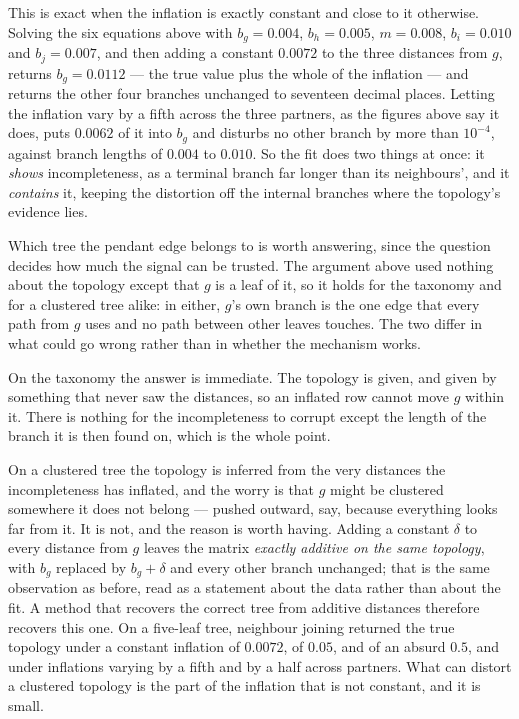 \documentclass[pdflatex,sn-vancouver-num]{sn-jnl}
\begin{document}
This is exact when the inflation is exactly constant and close to it otherwise. Solving the six
equations above with $b_g = 0.004$, $b_h = 0.005$, $m = 0.008$, $b_i = 0.010$ and $b_j = 0.007$, and
then adding a constant $0.0072$ to the three distances from $g$, returns $b_g = 0.0112$ --- the true
value plus the whole of the inflation --- and returns the other four branches unchanged to seventeen
decimal places. Letting the inflation vary by a fifth across the three partners, as the figures above
say it does, puts $0.0062$ of it into $b_g$ and disturbs no other branch by more than
$10^{-4}$, against branch lengths of $0.004$ to $0.010$. So the fit does two things at once: it \emph{shows} incompleteness, as a terminal
branch far longer than its neighbours', and it \emph{contains} it, keeping the distortion off the
internal branches where the topology's evidence lies.

Which tree the pendant edge belongs to is worth answering, since the question decides how much the
signal can be trusted. The argument above used nothing about the topology except that $g$ is a leaf of
it, so it holds for the taxonomy and for a clustered tree alike: in either, $g$'s own branch is the
one edge that every path from $g$ uses and no path between other leaves touches. The two differ in
what could go wrong rather than in whether the mechanism works.

On the taxonomy the answer is immediate. The topology is given, and given by something that never
saw the distances, so an inflated row cannot move $g$ within it. There is nothing for the
incompleteness to corrupt except the length of the branch it is then found on, which is the whole
point.

On a clustered tree the topology is inferred from the very distances the incompleteness has inflated,
and the worry is that $g$ might be clustered somewhere it does not belong --- pushed outward, say,
because everything looks far from it. It is not, and the reason is worth having. Adding a constant
$\delta$ to every distance from $g$ leaves the matrix \emph{exactly additive on the same topology},
with $b_g$ replaced by $b_g + \delta$ and every other branch unchanged; that is the same observation
as before, read as a statement about the data rather than about the fit. A method that recovers the
correct tree from additive distances therefore recovers this one. On a five-leaf tree,
neighbour joining returned the true topology under a constant inflation of $0.0072$, of $0.05$, and of
an absurd $0.5$, and under inflations varying by a fifth and by a half across partners. What can
distort a clustered topology is the part of the inflation that is not constant, and it is small.
\end{document}
